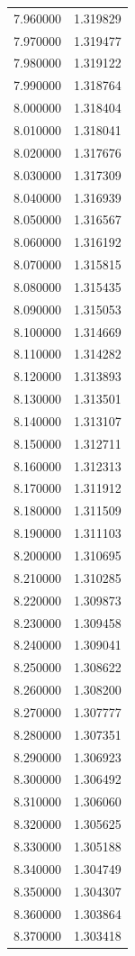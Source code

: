 \begin{tabular}{rr}
7.960000 & 1.319829 \\
7.970000 & 1.319477 \\
7.980000 & 1.319122 \\
7.990000 & 1.318764 \\
8.000000 & 1.318404 \\
8.010000 & 1.318041 \\
8.020000 & 1.317676 \\
8.030000 & 1.317309 \\
8.040000 & 1.316939 \\
8.050000 & 1.316567 \\
8.060000 & 1.316192 \\
8.070000 & 1.315815 \\
8.080000 & 1.315435 \\
8.090000 & 1.315053 \\
8.100000 & 1.314669 \\
8.110000 & 1.314282 \\
8.120000 & 1.313893 \\
8.130000 & 1.313501 \\
8.140000 & 1.313107 \\
8.150000 & 1.312711 \\
8.160000 & 1.312313 \\
8.170000 & 1.311912 \\
8.180000 & 1.311509 \\
8.190000 & 1.311103 \\
8.200000 & 1.310695 \\
8.210000 & 1.310285 \\
8.220000 & 1.309873 \\
8.230000 & 1.309458 \\
8.240000 & 1.309041 \\
8.250000 & 1.308622 \\
8.260000 & 1.308200 \\
8.270000 & 1.307777 \\
8.280000 & 1.307351 \\
8.290000 & 1.306923 \\
8.300000 & 1.306492 \\
8.310000 & 1.306060 \\
8.320000 & 1.305625 \\
8.330000 & 1.305188 \\
8.340000 & 1.304749 \\
8.350000 & 1.304307 \\
8.360000 & 1.303864 \\
8.370000 & 1.303418 \\

\end{tabular}
